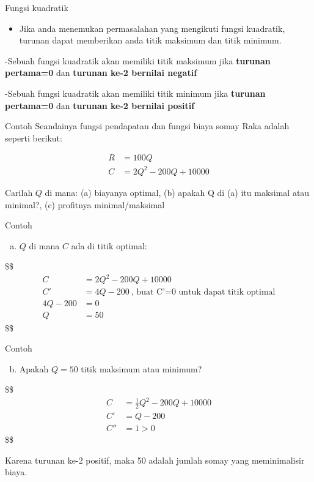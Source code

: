 \documentclass[
  ignorenonframetext,
]{beamer}
\providecommand{\tightlist}{%
  \setlength{\itemsep}{0pt}\setlength{\parskip}{0pt}}\usepackage{longtable,booktabs,array}
\begin{document}
\begin{frame}{Fungsi kuadratik}
\label{fungsi-kuadratik}
\begin{itemize}
\tightlist
\item
  Jika anda menemukan permasalahan yang mengikuti fungsi kuadratik,
  turunan dapat memberikan anda titik maksimum dan titik minimum.
\end{itemize}

-Sebuah fungsi kuadratik akan memiliki titik maksimum jika
\textbf{turunan pertama=0} dan \textbf{turunan ke-2 bernilai negatif}

-Sebuah fungsi kuadratik akan memiliki titik minimum jika
\textbf{turunan pertama=0} dan \textbf{turunan ke-2 bernilai positif}
\end{frame}

\begin{frame}{Contoh}
\label{contoh-7}
Seandainya fungsi pendapatan dan fungsi biaya somay Raka adalah seperti
berikut:

\[
\begin{align*}
R&=100Q \\
C&=2Q^2-200Q+10000
\end{align*}
\]

Carilah \(Q\) di mana: (a) biayanya optimal, (b) apakah Q di (a) itu
maksimal atau minimal?, (c) profitnya minimal/maksimal
\end{frame}

\begin{frame}{Contoh}
\label{contoh-8}
\begin{enumerate}
[a.]
\tightlist
\item
  \(Q\) di mana \(C\) ada di titik optimal:
\end{enumerate}

\$\$ \begin{align*}
C&=2Q^2-200Q+10000 \\
C'&=4Q-200 \ \text{, buat C'=0 untuk dapat titik optimal} \\
4Q-200&=0\\
Q&=50

\end{align*} \$\$
\end{frame}

\begin{frame}{Contoh}
\label{contoh-9}
\begin{enumerate}
[a.]
\setcounter{enumi}{1}
\tightlist
\item
  Apakah \(Q=50\) titik maksimum atau minimum?
\end{enumerate}

\$\$ \begin{align*}
C&=\frac{1}{2}Q^2-200Q+10000 \\
C'&=Q-200 \\
C''&=1 >0

\end{align*} \$\$

Karena turunan ke-2 positif, maka 50 adalah jumlah somay yang
meminimalisir biaya.
\end{frame}
\end{document}
